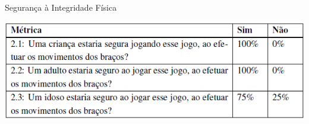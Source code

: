 \documentclass{beamer}
\begin{document}
\begin{frame}{Segurança à Integridade Física} 
    \begin{block}{}
			\center \includegraphics[height=1.4 in]{img/metricasq2.png}
    \end{block}
\end{frame}

%
\end{document}
